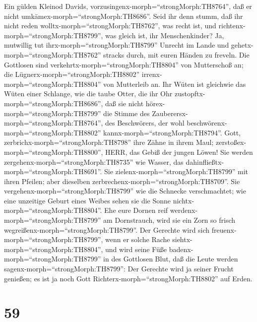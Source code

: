  Ein gülden Kleinod Davids,
vorzusingenx-morph=``strongMorph:TH8764'', daß er nicht
umkämex-morph=``strongMorph:TH8686''. Seid ihr denn stumm, daß ihr nicht
reden wolltx-morph=``strongMorph:TH8762'', was recht ist, und
richtenx-morph=``strongMorph:TH8799'', was gleich ist, ihr
Menschenkinder?  Ja, mutwillig tut
ihrx-morph=``strongMorph:TH8799'' Unrecht im Lande und
gehetx-morph=``strongMorph:TH8762'' stracks durch, mit euren Händen zu
freveln.  Die Gottlosen sind
verkehrtx-morph=``strongMorph:TH8804'' von Mutterschoß an; die
Lügnerx-morph=``strongMorph:TH8802'' irrenx-morph=``strongMorph:TH8804''
von Mutterleib an.  Ihr Wüten ist gleichwie das Wüten einer
Schlange, wie die taube Otter, die ihr Ohr
zustopftx-morph=``strongMorph:TH8686'',  daß sie nicht
hörex-morph=``strongMorph:TH8799'' die Stimme des
Zauberersx-morph=``strongMorph:TH8764'', des Beschwörers, der wohl
beschwörenx-morph=``strongMorph:TH8802''
kannx-morph=``strongMorph:TH8794''.  Gott,
zerbrichx-morph=``strongMorph:TH8798'' ihre Zähne in ihrem Maul;
zerstoßex-morph=``strongMorph:TH8800'', HERR, das Gebiß der jungen
Löwen!  Sie werden zergehenx-morph=``strongMorph:TH8735''
wie Wasser, das dahinfließtx-morph=``strongMorph:TH8691''. Sie
zielenx-morph=``strongMorph:TH8799'' mit ihren Pfeilen; aber dieselben
zerbrechenx-morph=``strongMorph:TH8709''.  Sie
vergehenx-morph=``strongMorph:TH8799'' wie die Schnecke verschmachtet;
wie eine unzeitige Geburt eines Weibes sehen sie die Sonne
nichtx-morph=``strongMorph:TH8804''.  Ehe eure Dornen reif
werdenx-morph=``strongMorph:TH8799'' am Dornstrauch, wird sie ein Zorn
so frisch wegreißenx-morph=``strongMorph:TH8799''.  Der
Gerechte wird sich freuenx-morph=``strongMorph:TH8799'', wenn er solche
Rache siehtx-morph=``strongMorph:TH8804'', und wird seine Füße
badenx-morph=``strongMorph:TH8799'' in des Gottlosen Blut, 
daß die Leute werden sagenx-morph=``strongMorph:TH8799'': Der Gerechte
wird ja seiner Frucht genießen; es ist ja noch Gott
Richterx-morph=``strongMorph:TH8802'' auf Erden.

\hypertarget{section-58}{%
\section{59}\label{section-58}}

